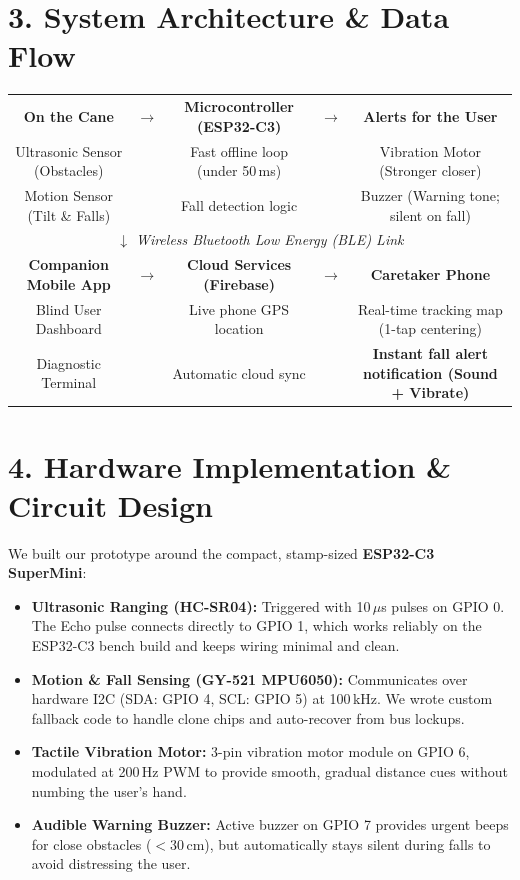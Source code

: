 \documentclass[10pt,a4paper]{article}
\begin{document}
\section{3. System Architecture \& Data Flow}
\begin{center}
\small
\begin{tabular}{|c|c|c|c|c|}
\hline
\textbf{On the Cane} & $\longrightarrow$ & \textbf{Microcontroller (ESP32-C3)} & $\longrightarrow$ & \textbf{Alerts for the User} \\
Ultrasonic Sensor (Obstacles) & & Fast offline loop (under 50\,ms) & & Vibration Motor (Stronger closer) \\
Motion Sensor (Tilt \& Falls) & & Fall detection logic & & Buzzer (Warning tone; silent on fall) \\
\hline
\multicolumn{5}{c}{$\boldsymbol{\downarrow}$ \textit{Wireless Bluetooth Low Energy (BLE) Link}} \\
\hline
\textbf{Companion Mobile App} & $\longrightarrow$ & \textbf{Cloud Services (Firebase)} & $\longrightarrow$ & \textbf{Caretaker Phone} \\
Blind User Dashboard & & Live phone GPS location & & Real-time tracking map (1-tap centering) \\
Diagnostic Terminal & & Automatic cloud sync & & \textbf{Instant fall alert notification (Sound + Vibrate)} \\
\hline
\end{tabular}
\end{center}

\section{4. Hardware Implementation \& Circuit Design}
We built our prototype around the compact, stamp-sized \textbf{ESP32-C3 SuperMini}:
\begin{itemize}
    \item \textbf{Ultrasonic Ranging (HC-SR04):} Triggered with 10\,$\mu$s pulses on GPIO 0. The Echo pulse connects directly to GPIO 1, which works reliably on the ESP32-C3 bench build and keeps wiring minimal and clean.
    \item \textbf{Motion \& Fall Sensing (GY-521 MPU6050):} Communicates over hardware I2C (SDA: GPIO 4, SCL: GPIO 5) at 100\,kHz. We wrote custom fallback code to handle clone chips and auto-recover from bus lockups.
    \item \textbf{Tactile Vibration Motor:} 3-pin vibration motor module on GPIO 6, modulated at 200\,Hz PWM to provide smooth, gradual distance cues without numbing the user's hand.
    \item \textbf{Audible Warning Buzzer:} Active buzzer on GPIO 7 provides urgent beeps for close obstacles ($<30$\,cm), but automatically stays silent during falls to avoid distressing the user.
\end{itemize}
\end{document}
